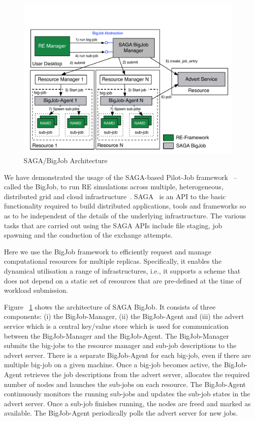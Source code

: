 \documentclass{rspublic}
\newcommand{\athotanote}[1]{ {\textcolor{green} { ***athota: #1 }}}
\newcommand{\athotanote}[1]{}
\begin{document}
\begin{figure}[t]
      \centering
          \includegraphics[scale=0.45]{../figures/Bigjob_arch.pdf}
          \caption{\footnotesize SAGA/BigJob Architecture
              }
      \label{fig:bigjob}
\end{figure}

We have demonstrated the usage of the SAGA-based Pilot-Job
framework~\citep{saga_bigjob_condor_cloud} -- called the BigJob, to
run RE simulations across multiple, heterogeneous, distributed grid
and cloud infrastructure~\citep{Luckow:2008fp}.
SAGA~\citep{saga-url} %
is an API to the basic functionality required to build distributed
applications, tools and frameworks so as to be independent of the
details of the underlying infrastructure.  The various tasks that are
carried out using the SAGA APIs include file staging, job spawning and
the conduction of the exchange attempts.

Here we use the BigJob framework to efficiently request and manage
computational resources for multiple replicas.  Specifically, it
enables the dynamical utilisation a range of infrastructures, i.e., it
supports a scheme that does not depend on a static set of resources
that are pre-defined at the time of workload submission.

Figure ~\ref{fig:bigjob} shows the architecture of SAGA BigJob.  It
consists of three components: (i) the BigJob-Manager, (ii) the
BigJob-Agent and (iii) the advert service which is a central key/value
store which is used for communication between the BigJob-Manager
and the BigJob-Agent.  The BigJob-Manager submits the big-jobs to
the resource manager and sub-job descriptions to the advert server.
There is a separate BigJob-Agent for each big-job, even if there are
multiple big-job on a given machine.  Once a big-job becomes active,
the BigJob-Agent retrieves the job descriptions from the advert
server, allocates the required number of nodes and launches the
sub-jobs on each resource. The BigJob-Agent continuously monitors the
running sub-jobs and updates the sub-job states in the advert
server. Once a sub-job finishes running, the nodes are freed and
marked as available. The BigJob-Agent periodically polls the advert
server for new jobs.
\end{document}

